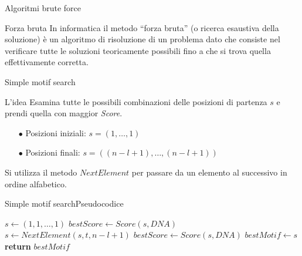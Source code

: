 	\begin{frame}{Algoritmi brute force}
		\begin{block}{Forza bruta}
			In informatica il metodo ``forza bruta'' (o ricerca esaustiva della soluzione) è un algoritmo di risoluzione di un problema dato che consiste nel verificare tutte le soluzioni teoricamente possibili fino a che si trova quella effettivamente corretta.
		\end{block}
	\end{frame}
	
	\begin{frame}{Simple motif search}
		\begin{flushleft}
			\begin{block}{L'idea}
				Esamina tutte le possibili combinazioni delle posizioni di partenza $s$ e prendi quella con maggior \textit{Score}.
			\end{block}
		\end{flushleft}
	\begin{flushleft}
		\begin{itemize}
			\item[$\bullet$] Posizioni iniziali: $s=(1,\dots,1)$
			\item[$\bullet$] Posizioni  finali: $s=((n-l+1),\dots,(n-l+1))$
		\end{itemize}
	\end{flushleft}
	\begin{flushleft}
		Si utilizza il metodo $NextElement$ per passare da un elemento al successivo in ordine alfabetico.
	\end{flushleft}
	\end{frame}
	
	\begin{frame}{Simple motif search}{Pseudocodice}
		\begin{center}
			\begin{minipage}{7.7cm}
			    \begin{algorithmic}[1]
					    \State $s\gets (1,1,\dots,1)$
					    \State $bestScore\gets Score(s,DNA)$
					    	\State $s\gets NextElement(s,t,n-l+1)$
					    		\State $bestScore\gets Score(s,DNA)$
					    		\State $bestMotif\gets s$
					    	\EndIf
					    		\State \textbf{return} $bestMotif$
					    	\EndIf
					    \EndWhile
				    \EndProcedure
			    \end{algorithmic}
			\end{minipage}
	    \end{center}
	\end{frame}
	
